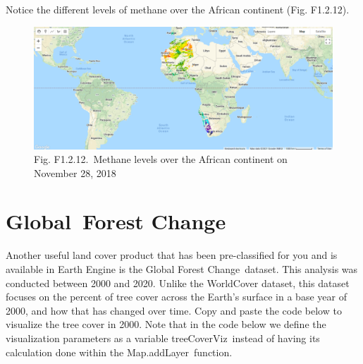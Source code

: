 \documentclass[
  letterpaper,
  DIV=11,
  numbers=noendperiod]{scrreprt}
\begin{document}
Notice the different levels of methane over the African continent (Fig.
F1.2.12).

\begin{figure}

{\centering \includegraphics{./F1/image56.png}

}

\caption{Fig. F1.2.12.~Methane levels over the African continent on
November 28, 2018}

\end{figure}

\hypertarget{global-forest-change}{%
\section{Global~Forest Change}\label{global-forest-change}}

Another useful land cover product that has been pre-classified for you
and is available in Earth Engine is the Global Forest Change~dataset.
This analysis was conducted between 2000 and 2020. Unlike the WorldCover
dataset, this dataset focuses on the percent of tree cover across the
Earth's surface in a base year of 2000, and how that has changed over
time. Copy and paste the code below to visualize the tree cover in 2000.
Note that in the code below we define the visualization parameters as a
variable treeCoverViz~instead of having its calculation done within the
Map.addLayer~function.
\end{document}

